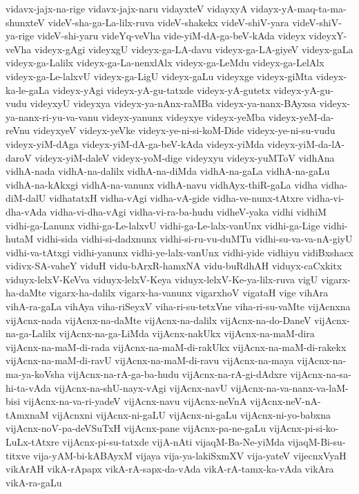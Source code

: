 {vidavx-jajx-na-rige
vidavx-jajx-naru
vidayxteV
vidayxyA
vidayx-yA-maq-ta-ma-shunxteV
videV-sha-ga-La-lilx-ruva
videV-shakekx
videV-shiV-yara
videV-shiV-ya-rige
videV-shi-yaru
videYq-veVha
vide-yiM-dA-ga-beV-kAda
videyx
videyxY-veVha
videyx-gAgi
videyxgU
videyx-ga-LA-davu
videyx-ga-LA-giyeV
videyx-gaLa
videyx-ga-Lalilx
videyx-ga-La-nenxlAlx
videyx-ga-LeMdu
videyx-ga-LelAlx
videyx-ga-Le-lalxvU
videyx-ga-LigU
videyx-gaLu
videyxge
videyx-giMta
videyx-ka-le-gaLa
videyx-yAgi
videyx-yA-gu-tatxde
videyx-yA-gutetx
videyx-yA-gu-vudu
videyxyU
videyxya
videyx-ya-nAnx-raMBa
videyx-ya-nanx-BAyxsa
videyx-ya-nanx-ri-yu-va-vanu
videyx-yanunx
videyxye
videyx-yeMba
videyx-yeM-da-reVnu
videyxyeV
videyx-yeVke
videyx-ye-ni-si-koM-Dide
videyx-ye-ni-su-vudu
videyx-yiM-dAga
videyx-yiM-dA-ga-beV-kAda
videyx-yiMda
videyx-yiM-da-lA-daroV
videyx-yiM-daleV
videyx-yoM-dige
videyxyu
videyx-yuMToV
vidhAna
vidhA-nada
vidhA-na-dalilx
vidhA-na-diMda
vidhA-na-gaLa
vidhA-na-gaLu
vidhA-na-kAkxgi
vidhA-na-vanunx
vidhA-navu
vidhAyx-thiR-gaLa
vidha
vidha-diM-dalU
vidhatatxH
vidha-vAgi
vidha-vA-gide
vidha-ve-nunx-tAtxre
vidha-vi-dha-vAda
vidha-vi-dha-vAgi
vidha-vi-ra-ba-hudu
vidheV-yaka
vidhi
vidhiM
vidhi-ga-Lanunx
vidhi-ga-Le-lalxvU
vidhi-ga-Le-lalx-vanUnx
vidhi-ga-Lige
vidhi-hutaM
vidhi-sida
vidhi-si-dadxnunx
vidhi-si-ru-vu-duMTu
vidhi-su-va-va-nA-giyU
vidhi-va-tAtxgi
vidhi-yanunx
vidhi-ye-lalx-vanUnx
vidhi-yide
vidhiyu
vidiBxshacx
vidivx-SA-vaheY
viduH
vidu-bArxR-hamxNA
vidu-buRdhAH
viduyx-caCxkitx
viduyx-lelxV-KeVva
viduyx-lelxV-Keya
viduyx-lelxV-Ke-ya-lilx-ruva
vigU
vigarx-ha-daMte
vigarx-ha-dalilx
vigarx-ha-vanunx
vigarxhoV
vigataH
vige
vihAra
vihA-ra-gaLa
vihAya
viha-riSeyxV
viha-ri-su-tetxVne
viha-ri-su-vaMte
vijAcnxna
vijAcnx-nada
vijAcnx-na-daMte
vijAcnx-na-dalilx
vijAcnx-na-do-DaneV
vijAcnx-na-ga-Lalilx
vijAcnx-na-ga-LiMda
vijAcnx-nakUkx
vijAcnx-na-maM-dira
vijAcnx-na-maM-di-rada
vijAcnx-na-maM-di-rakUkx
vijAcnx-na-maM-di-rakekx
vijAcnx-na-maM-di-ravU
vijAcnx-na-maM-di-ravu
vijAcnx-na-maya
vijAcnx-na-ma-ya-koVsha
vijAcnx-na-rA-ga-ba-hudu
vijAcnx-na-rA-gi-dAdxre
vijAcnx-na-sa-hi-ta-vAda
vijAcnx-na-shU-nayx-vAgi
vijAcnx-navU
vijAcnx-na-va-nanx-va-laM-bisi
vijAcnx-na-va-ri-yadeV
vijAcnx-navu
vijAcnx-neVnA
vijAcnx-neV-nA-tAmxnaM
vijAcnxni
vijAcnx-ni-gaLU
vijAcnx-ni-gaLu
vijAcnx-ni-yo-babxna
vijAcnx-noV-pa-deVSuTxH
vijAcnx-pane
vijAcnx-pa-ne-gaLu
vijAcnx-pi-si-ko-LuLx-tAtxre
vijAcnx-pi-su-tatxde
vijA-nAti
vijaqM-Ba-Ne-yiMda
vijaqM-Bi-su-titxve
vija-yAM-bi-kABAyxM
vijaya
vija-ya-lakiSxmXV
vija-yateV
vijecnxVyaH
vikArAH
vikA-rApapx
vikA-rA-sapx-da-vAda
vikA-rA-tamx-ka-vAda
vikAra
vikA-ra-gaLu
}
